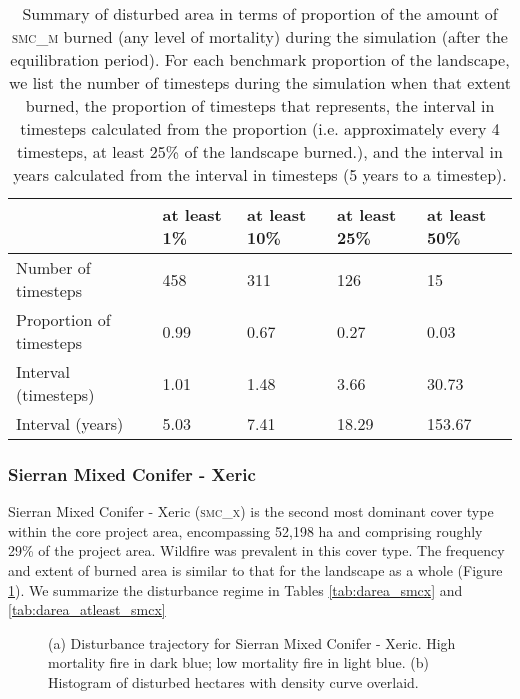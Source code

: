 \begin{table}[!htbp]
\centering
\caption{Summary of disturbed area in terms of proportion of the amount of \textsc{smc\_m} burned (any level of mortality) during the simulation (after the equilibration period). For each benchmark proportion of the landscape, we list the number of timesteps during the simulation when that extent burned, the proportion of timesteps that represents, the interval in timesteps calculated from the proportion (i.e. approximately every 4 timesteps, at least 25\% of the landscape burned.), and the interval in years calculated from the interval in timesteps (5 years to a timestep).}
\label{tab:darea_atleast_smcm}
\begin{tabular}{@{}lllll@{}}
                        & at least 1\% & at least 10\% & at least 25\% & at least 50\% \\ \midrule
Number of timesteps     & 458          & 311           & 126           & 15            \\
Proportion of timesteps & 0.99         & 0.67          & 0.27          & 0.03          \\
Interval (timesteps)    & 1.01         & 1.48          & 3.66          & 30.73         \\
Interval (years)        & 5.03         & 7.41          & 18.29         & 153.67       \\ \bottomrule
\end{tabular}
\end{table}



\subsubsection{Sierran Mixed Conifer - Xeric}
Sierran Mixed Conifer - Xeric (\textsc{smc\_x}) is the second most dominant cover type within the core project area, encompassing 52,198 ha and comprising roughly 29\% of the project area. Wildfire was prevalent in this cover type. The frequency and extent of burned area is similar to that for the landscape as a whole (Figure \ref{fig:darea_smcx}). We summarize the disturbance regime in Tables \ref{tab:darea_smcx} and \ref{tab:darea_atleast_smcx}

\begin{figure}[!htbp]
  \centering
  \caption{\small (a) Disturbance trajectory for Sierran Mixed Conifer - Xeric. High mortality fire in dark blue; low mortality fire in light blue. (b) Histogram of disturbed hectares with density curve overlaid.} 
  \label{fig:darea_smcx}
\end{figure}

